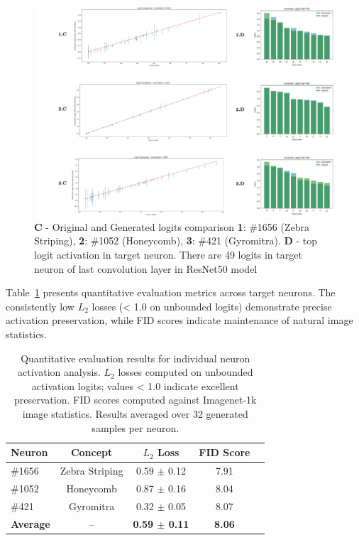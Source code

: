\begin{figure}[h]
\centering
\includegraphics[width=\linewidth]{figures/main/sae_results_2.png}
\caption{ \textbf{C} - Original and Generated logits comparison  \textbf{1}: \#1656 (Zebra Striping), \textbf{2}: \#1052 (Honeycomb), \textbf{3}: \#421 (Gyromitra). \textbf{D} - top logit activation in target neuron. There are 49 logits in target neuron of last convolution layer in ResNet50 model}
\label{fig:experiment_1_1}
\end{figure}

Table~\ref{tab:neuron_results} presents quantitative evaluation metrics across target neurons. The consistently low $L_2$ losses (< 1.0 on unbounded logits) demonstrate precise activation preservation, while FID scores indicate maintenance of natural image statistics.

\begin{table}[h!]
\centering
\begin{tabular}{lcccc}
\toprule
\textbf{Neuron} & \textbf{Concept} & \textbf{$L_2$ Loss} & \textbf{FID Score}\\
\midrule
\#1656 & Zebra Striping & 0.59 $\pm$ 0.12 & 7.91 \\
\#1052 & Honeycomb & 0.87 $\pm$ 0.16 & 8.04\\
\#421 & Gyromitra & 0.32 $\pm$ 0.05 & 8.07\\
\midrule
\textbf{Average} & -- & \textbf{0.59 $\pm$ 0.11} & \textbf{8.06}  \\
\bottomrule
\end{tabular}
\caption{Quantitative evaluation results for individual neuron activation analysis. $L_2$ losses computed on unbounded activation logits; values < 1.0 indicate excellent preservation. FID scores computed against Imagenet-1k  image statistics. Results averaged over 32 generated samples per neuron.}
\label{tab:neuron_results}
\end{table}

